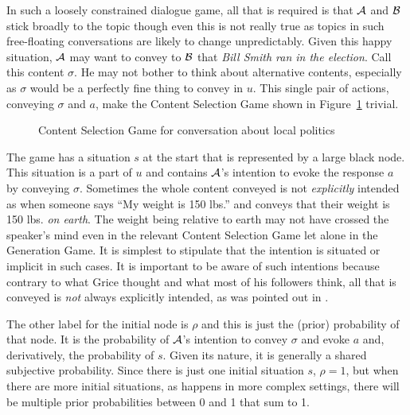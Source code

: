 In such a loosely constrained dialogue game, all that is required is that $\cal A$ and $\cal B$ stick broadly to the topic though even this is not really true as topics in such free-floating conversations are likely to change unpredictably. Given this happy situation, $\cal A$ may want to convey to $\cal B$ that \emph{Bill Smith ran in the election}. Call this content $\sigma$. He may not bother to think about alternative contents, especially as $\sigma$ would be a perfectly fine thing to convey in $u$. This single pair of actions, conveying $\sigma$ and $a$, make the Content Selection Game shown in Figure~\ref{fig:CS} trivial.  

\begin{figure}[h] 

\caption{Content Selection Game for conversation about local politics}
\label{fig:CS}
\end{figure}

The game has a situation $s$ at the start that is represented by a large black node. This situation is a part of $u$ and contains $\cal A$'s intention to evoke the response $a$ by conveying $\sigma$. Sometimes the whole content conveyed is not \emph{explicitly} intended as when someone says ``My weight is 150 lbs.'' and conveys that their weight is 150 lbs. \emph{on earth}. The weight being relative to earth may not have crossed the speaker's mind even in the relevant Content Selection Game let alone in the Generation Game. It is simplest to stipulate that the intention is situated or implicit in such cases. It is important to be aware of such intentions because contrary to what Grice thought and what most of his followers think, all that is conveyed is \emph{not} always explicitly intended, as was pointed out in .

The other label for the initial node is $\rho$ and this is just the (prior) probability of that node. It is the probability of $\cal A$'s intention to convey $\sigma$ and evoke $a$ and, derivatively, the probability of $s$. Given its nature, it is generally a shared subjective probability. Since there is just one initial situation $s$, $\rho = 1$, but when there are more initial situations, as happens in more complex settings, there will be multiple prior probabilities between 0 and 1 that sum to 1.

